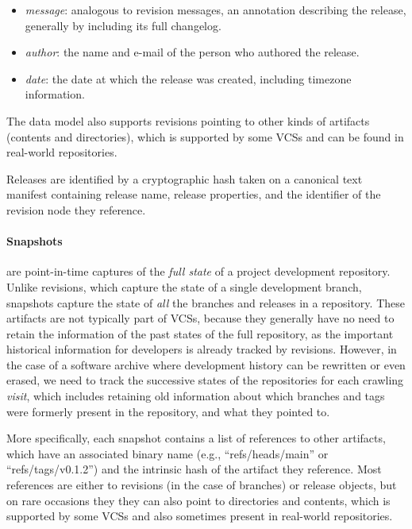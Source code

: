 \begin{itemize}
    \setlength\itemsep{0em}
    \item \emph{message}: analogous to revision messages, an annotation
        describing the release, generally by including its full changelog.
    \item \emph{author}: the name and e-mail of the person who authored the
        release.
    \item \emph{date}: the date at which the release was created, including
        timezone information.
\end{itemize}

The data model also supports revisions pointing to other kinds of artifacts
(contents and directories), which is supported by some \glspl{VCS} and can be
found in real-world repositories.

Releases are identified by a cryptographic hash taken on a canonical text
manifest containing release name, release properties, and the identifier of the
revision node they reference.


\begin{figure}\centering
{}
\end{figure}
\paragraph{\textbf{Snapshots}} are point-in-time captures of the \emph{full
state} of a project development repository. Unlike revisions, which capture the
state of a single development branch, snapshots capture the state of \emph{all}
the branches and releases in a repository. These artifacts are not typically
part of \glspl{VCS}, because they generally have no need to retain the
information of the past states of the full repository, as the important
historical information for developers is already tracked by revisions. However,
in the case of a software archive where development history can be rewritten or
even erased, we need to track the successive states of the repositories for
each crawling \emph{visit}, which includes retaining old information about
which branches and tags were formerly present in the repository, and what they
pointed to.

More specifically, each snapshot contains a list of references to other
artifacts, which have an associated binary name (e.g., ``refs/heads/main'' or
``refs/tags/v0.1.2'') and the intrinsic hash of the artifact they reference.
Most references are either to revisions (in the case of branches) or release
objects, but on rare occasions they they can also point to directories and
contents, which is supported by some \glspl{VCS} and also sometimes present in
real-world repositories.

